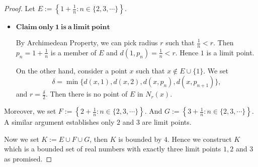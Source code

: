 \begin{Exercise}
	\begin{proof}
		Let $E := \left\{ 1+\frac{1}{n} : n\in \{2,3,\cdots\} \right\}$.
		\begin{itemize}
			\item $\mathbf{Claim\ only\ 1\ is\ a\ limit\ point}$
			
			By Archimedean Property, we can pick radius $r$ such that $\frac{1}{n} < r$. 
			Then $p_n = 1+\frac{1}{n}$ is a member of $E$ and $d(1, p_n) = \frac{1}{n} < r$. 
			Hence $1$ is a limit point.
			
			On the other hand, consider a point $x$ such that $x\notin E\cup \{1\}$. 
			We set 
			$$
			\delta = \min\{d(x,1), d(x,2), d(x, p_n), d(x, p_{n+1})\},
			$$
			and $r = \frac{\delta}{2}$. 
			Then there is no point of $E$ in $N_r(x)$.
		\end{itemize}
		
		Moreover, we set $F := \left\{ 2+\frac{1}{n} : n\in \{2,3,\cdots\} \right\}$. 
		And $G := \left\{ 3+\frac{1}{n} : n\in \{2,3,\cdots\} \right\}$. 
		A similar argument establishes only $2$ and $3$ are limit points.
		
		Now we set $K := E\cup F\cup G$, then $K$ is bounded by $4$.
		Hence we construct $K$ which is a bounded set of real numbers with exactly three limit points $1,2$ and $3$ as promised.
	\end{proof}
\end{Exercise}